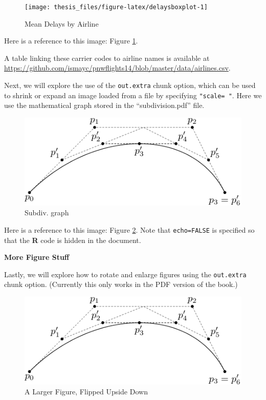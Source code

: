 \documentclass[print]{nuthesis}
\begin{document}
\begin{figure}
\texttt{[image: thesis\_files/figure-latex/delaysboxplot-1]} \caption{Mean Delays by Airline}\label{fig:delaysboxplot}
\end{figure}

Here is a reference to this image: Figure \ref{fig:delaysboxplot}.

A table linking these carrier codes to airline names is available at \url{https://github.com/ismayc/pnwflights14/blob/master/data/airlines.csv}.

\clearpage

Next, we will explore the use of the \texttt{out.extra} chunk option, which can be used to shrink or expand an image loaded from a file by specifying \texttt{"scale=\ "}. Here we use the mathematical graph stored in the ``subdivision.pdf'' file.

\begin{figure}
\includegraphics[width=\linewidth,scale=0.75]{figure/subdivision} \caption{Subdiv. graph}\label{fig:subd}
\end{figure}

Here is a reference to this image: Figure \ref{fig:subd}. Note that \texttt{echo=FALSE} is specified so that the \textbf{R} code is hidden in the document.

\textbf{More Figure Stuff}

Lastly, we will explore how to rotate and enlarge figures using the \texttt{out.extra} chunk option. (Currently this only works in the PDF version of the book.)

\begin{figure}
\includegraphics[width=\linewidth,angle=180, scale=1.1]{figure/subdivision} \caption{A Larger Figure, Flipped Upside Down}\label{fig:subd2}
\end{figure}
\end{document}
